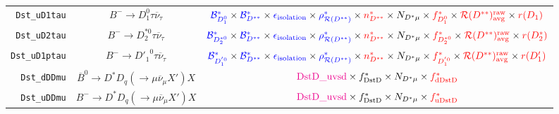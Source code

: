 \begin{landscape}
\begin{table}
\begin{tabular}{r|c|c}
  \texttt{Dst\_uD1tau} &                 $B^- \rightarrow D_1^0 \tau \overline{\nu}_\tau$                  &     $\textcolor{blue}{\mathcal{B}^{*}_{D_1^0}} \times \textcolor{blue}{\mathcal{B}^*_{D^{**}}} \times \textcolor{blue}{\epsilon_\text{isolation}} \times \textcolor{blue}{\rho_{\mathcal{R}(D^{**})}^*} \times \textcolor{red}{n^{*}_{D^{**}}} \times N_{D^* \mu} \times \textcolor{red}{f^{*}_{D_1^0}} \times \textcolor{red}{\mathcal{R}(D^{**})_\text{avg}^\text{raw}} \times \textcolor{red}{r({D_1})}$     \\
  \texttt{Dst\_uD2tau} &                $B^- \rightarrow D_2^{*0} \tau \overline{\nu}_\tau$                & $\textcolor{blue}{\mathcal{B}^{*}_{D_2^{*0}}} \times \textcolor{blue}{\mathcal{B}^*_{D^{**}}} \times \textcolor{blue}{\epsilon_\text{isolation}} \times \textcolor{blue}{\rho_{\mathcal{R}(D^{**})}^*} \times \textcolor{red}{n^{*}_{D^{**}}} \times N_{D^* \mu} \times \textcolor{red}{f^{*}_{D_2^{*0}}} \times \textcolor{red}{\mathcal{R}(D^{**})_\text{avg}^\text{raw}} \times \textcolor{red}{r({D_2^*})}$ \\
 \texttt{Dst\_uD1ptau} &                $B^- \rightarrow {D'_1}^0 \tau \overline{\nu}_\tau$                & $\textcolor{blue}{\mathcal{B}^{*}_{D_1^{'0}}} \times \textcolor{blue}{\mathcal{B}^*_{D^{**}}} \times \textcolor{blue}{\epsilon_\text{isolation}} \times \textcolor{blue}{\rho_{\mathcal{R}(D^{**})}^*} \times \textcolor{red}{n^{*}_{D^{**}}} \times N_{D^* \mu} \times \textcolor{red}{f^{*}_{D_1^{'0}}} \times \textcolor{red}{\mathcal{R}(D^{**})_\text{avg}^\text{raw}} \times \textcolor{red}{r({D'_1})}$  \\
   \texttt{Dst\_dDDmu} &  $\overline{B}^0 \rightarrow D^* D_q (\rightarrow \mu \overline{\nu}_\mu X') X$   &                                                                                                                                         $\textcolor{magenta}{\text{DstD\_uvsd}} \times f^{*}_\text{DstD} \times N_{D^* \mu} \times \textcolor{red}{f^{*}_\text{dDstD}}$                                                                                                                                         \\
   \texttt{Dst\_uDDmu} &        $B^- \rightarrow D^* D_q (\rightarrow \mu \overline{\nu}_\mu X') X$        &                                                                                                                                         $\textcolor{magenta}{\text{DstD\_uvsd}} \times f^{*}_\text{DstD} \times N_{D^* \mu} \times \textcolor{red}{f^{*}_\text{uDstD}}$                                                                                                                                         \\

\end{tabular}
\end{table}
\end{landscape}
